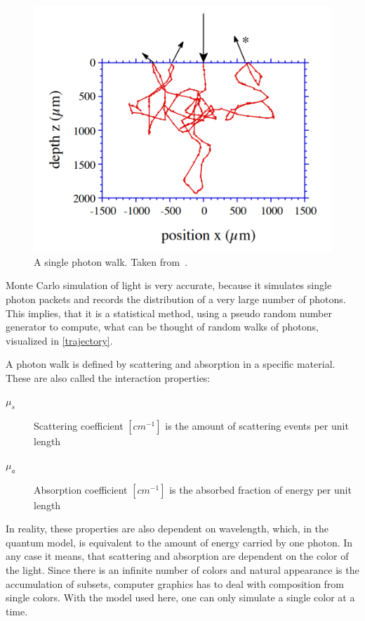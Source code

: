 \documentclass[]{article}
\begin{document}
\begin{figure}[ht!]
	\includegraphics[width=\linewidth]{img/trajectory.png}
	\caption{A single photon walk. Taken from~\cite{wang1992monte}.}
	\label{trajectory}
\end{figure}

Monte Carlo simulation of light is very accurate, because it simulates single photon packets and records the distribution of a very large number of photons. This implies, that it is a statistical method, using a pseudo random number generator to compute, what can be thought of random walks of photons, visualized in \autoref{trajectory}.

A photon walk is defined by scattering and absorption in a specific material. These are also called the interaction properties:

\begin{description}
	\item[$\mu_s$] Scattering coefficient $[cm^{-1}]$ is the amount of scattering events per unit length
	\item[$\mu_a$] Absorption coefficient $[cm^{-1}]$ is the absorbed fraction of energy per unit length
\end{description}

In reality, these properties are also dependent on wavelength, which, in the quantum model, is equivalent to the amount of energy carried by one photon. In any case it means, that scattering and absorption are dependent on the color of the light. Since there is an infinite number of colors and natural appearance is the accumulation of subsets, computer graphics has to deal with composition from single colors. With the model used here, one can only simulate a single color at a time.
\end{document}
